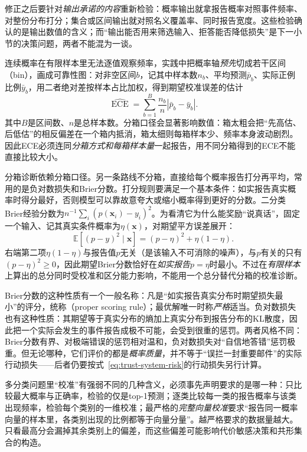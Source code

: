 修正之后要针对\emph{输出承诺的内容}重新检验：概率输出就拿报告概率对照事件频率、对整份分布打分；集合或区间输出就对照名义覆盖率、同时报告宽度。这些检验确认的是输出数值的含义；而“输出能否用来筛选输入、拒答能否降低损失”是下一小节的决策问题，两者不能混为一谈。

连续概率在有限样本里无法逐值观察频率，实践中把概率轴\emph{预先}切成若干区间（bin），画成可靠性图：对非空区间$b$，记其中样本数$n_b$、平均预测$\bar p_b$、实际正例比例$\bar y_b$，用二者绝对差按样本占比加权，得到期望校准误差的估计
\begin{equation}
 \widehat{\operatorname{ECE}}
 =\sum_{b=1}^{B}\frac{n_b}{n}
       |\bar p_b-\bar y_b|.
 \label{eq:reliability-ece}
\end{equation}
其中$B$是区间数、$n$是总样本数。分箱口径会显著影响数值：箱太粗会把“先高估、后低估”的相反偏差在一个箱内抵消，箱太细则每箱样本少、频率本身波动剧烈。因此ECE必须连同\emph{分箱方式和每箱样本量}一起报告，用不同分箱得到的ECE不能直接比较大小。

分箱诊断依赖分箱口径。另一条路线不分箱，直接给每个概率报告打分再平均，常用的是负对数损失和Brier分数。打分规则要满足一个基本条件：如实报告真实概率时得分最好，否则模型可以靠故意夸大或缩小概率得到更好的分数。二分类Brier经验分数为$n^{-1}\sum_i(p(\bm{x}_i)-y_i)^2$。为看清它为什么能奖励“说真话”，固定一个输入、记其真实条件概率为$\eta(\bm{x})$，对期望平方误差展开：
\[
 \mathbb E[(p-y)^2\mid\bm{x}]
 =(p-\eta)^2+\eta(1-\eta).
\]
右端第二项$\eta(1-\eta)$与报告值$p$无关（是该输入不可消除的噪声），与$p$有关的只有$(p-\eta)^2\geq0$，因此期望Brier分数恰好在\emph{如实报告$p=\eta$}时最小。不过在\emph{有限样本}上算出的总分同时受校准和区分能力影响，不能用一个总分替代分箱的校准诊断。

Brier分数的这种性质有一个一般名称：凡是“如实报告真实分布时期望损失最小”的评分，统称（proper scoring rule）；最优解唯一时称\emph{严格}适当。负对数损失也有这种性质：其期望等于真实分布的熵加上真实分布到报告分布的KL散度，因此把一个实际会发生的事件报告成极不可能，会受到很重的惩罚。两者风格不同：Brier分数有界、对极端错误的惩罚相对温和，负对数损失对“自信地答错”惩罚极重。但无论哪种，它们评价的都是\emph{概率质量}，并不等于“误拦一封重要邮件”的实际行动损失——后者仍要按式~\eqref{eq:trust-system-risk}的行动损失另行计算。

多分类问题里“校准”有强弱不同的几种含义，必须事先声明要求的是哪一种：只比较最大概率与正确率，检验的仅是top-1预测；逐类比较每一类的报告概率与该类出现频率，检验每个类别的一维校准；最严格的\emph{完整向量校准}要求“报告同一概率向量的样本里，各类别出现的比例都等于向量分量”。越严格要求的数据量越大。只看最高分会漏掉其余类别上的偏差，而这些偏差可能影响代价敏感决策和共形集合的构造。

